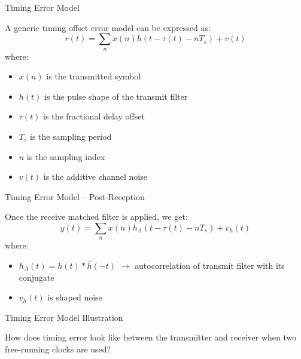 \documentclass[10pt]{beamer}
\begin{document}
\begin{frame}[fragile]{Timing Error Model}
 
A generic timing offset error model can be expressed as:
\begin{equation}
 r(t)=\sum\limits_{n}x(n)h(t-\tau(t)-nT_s)+v(t)
\end{equation}
where:
\begin{itemize}
 \item $x(n)$ is the transmitted symbol
 \item $h(t)$ is the pulse shape of the transmit filter
 \item $\tau(t)$ is the fractional delay offset
 \item $T_s$ is the sampling period
 \item $n$ is the sampling index
 \item $v(t)$ is the additive channel noise
\end{itemize}


\end{frame}



\begin{frame}[fragile]{Timing Error Model -- Post-Reception}

Once the receive matched filter is applied, we get:
\begin{equation}
 y(t)=\sum\limits_{n}x(n)h_A(t-\tau(t)-nT_s)+v_h(t)
\end{equation}
where:
\begin{itemize}
 \item $h_A(t)=h(t)\ast{\bar{h}(-t)}$ $\rightarrow$ autocorrelation of transmit filter with its conjugate
 \item $v_h(t)$ is shaped noise
\end{itemize}

 
\end{frame}


\begin{frame}[fragile]{Timing Error Model Illustration}

How does timing error look like between the transmitter and receiver when two free-running clocks are used?
 
\end{frame}


\end{document}
